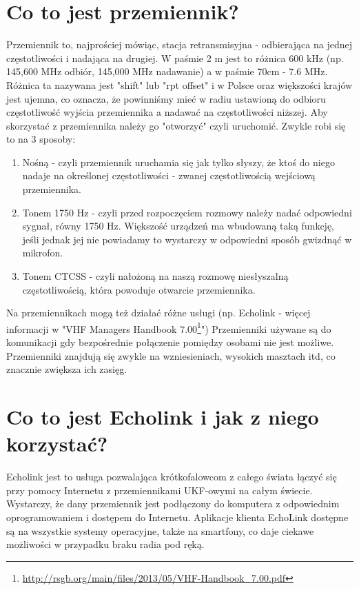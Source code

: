 \documentclass[a4paper,12pt]{article}
\begin{document}
\section{Co to jest przemiennik?}
Przemiennik to, najprościej mówiąc, stacja retransmisyjna - odbierająca na jednej częstotliwości i nadająca na drugiej. W paśmie 2 m jest to różnica 600 kHz (np. 145,600 MHz odbiór, 145,000 MHz nadawanie) a w paśmie 70cm - 7.6 MHz. Różnica ta nazywana jest "shift" lub "rpt offset" i w Polsce oraz większości krajów jest ujemna, co oznacza, że powinniśmy mieć w radiu ustawioną do odbioru częstotliwość wyjścia przemiennika a nadawać na częstotliwości niższej. Aby skorzystać z przemiennika należy go "otworzyć" czyli uruchomić. Zwykle robi się to na 3 sposoby:

\begin{enumerate}
 \item Nośną - czyli przemiennik uruchamia się jak tylko słyszy, że ktoś do niego nadaje na określonej częstotliwości - zwanej częstotliwością wejściową przemiennika.
 \item Tonem 1750 Hz - czyli przed rozpoczęciem rozmowy należy nadać odpowiedni sygnał, równy 1750 Hz. Większość urządzeń ma wbudowaną taką funkcję, jeśli jednak jej nie powiadamy to wystarczy w odpowiedni sposób gwizdnąć w mikrofon.
 \item Tonem CTCSS - czyli nałożoną na naszą rozmowę niesłyszalną częstotliwością, która powoduje otwarcie przemiennika.
\end{enumerate}


Na przemiennikach mogą też działać różne usługi (np. Echolink - więcej informacji w "VHF Managers Handbook 7.00\footnote{\url{http://rsgb.org/main/files/2013/05/VHF-Handbook_7.00.pdf}}") Przemienniki używane są do komunikacji gdy bezpośrednie połączenie pomiędzy osobami nie jest możliwe. Przemienniki znajdują się zwykle na wzniesieniach, wysokich masztach itd, co znacznie zwiększa ich zasięg.

\section{Co to jest Echolink i jak z niego korzystać?}
Echolink jest to usługa pozwalająca krótkofalowcom z całego świata łączyć się przy pomocy Internetu z przemiennikami UKF-owymi na całym świecie. Wystarczy, że dany przemiennik jest podłączony do komputera z odpowiednim oprogramowaniem i dostępem do Internetu.
Aplikacje klienta EchoLink dostępne są na wszystkie systemy operacyjne, także na smartfony, co daje ciekawe możliwości w przypadku braku radia pod ręką.
\end{document}
